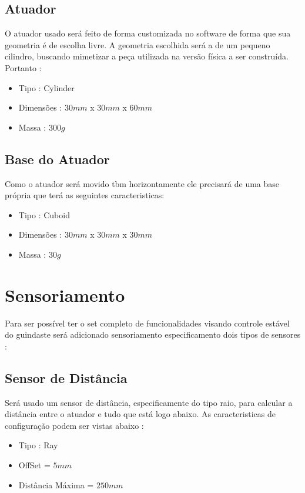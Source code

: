 \documentclass[letterpaper, 10 pt]{ieeeconf}  %
\begin{document}
    \subsection{Atuador}
        O atuador usado será feito de forma customizada no software de forma que sua geometria é de 
        escolha livre. A geometria escolhida será a de um pequeno cilindro, buscando mimetizar a peça 
        utilizada na versão física a ser construída. Portanto :
        \begin{itemize}
            \item Tipo : Cylinder
            \item Dimensões : \(30mm\) x \(30mm\) x \(60mm\)
            \item Massa : \(300g\)
        \end{itemize}
    \subsection{Base do Atuador}
        Como o atuador será movido tbm horizontamente ele precisará de uma base própria que terá as seguintes caracteristicas:
        \begin{itemize}
            \item Tipo : Cuboid
            \item Dimensões : \(30mm\) x \(30mm\) x \(30mm\)
            \item Massa : \(30g\)
        \end{itemize}
    \section{Sensoriamento}
        Para ser possível ter o set completo de funcionalidades visando controle estável do guindaste será adicionado
        sensoriamento especificamento dois tipos de sensores :
        \subsection{Sensor de Distância}
            Será usado um sensor de distância, especificamente do tipo raio, para calcular a distância entre o atuador 
            e tudo que está logo abaixo. As caracteristicas de configuração podem ser vistas abaixo :
            \begin{itemize}
                \item Tipo : Ray
                \item OffSet = \(5mm\)
                \item Distância Máxima = \(250mm\)
            \end{itemize}
\end{document}

